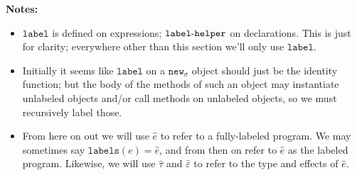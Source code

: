\documentclass{llncs}
\newcommand{\keywadj}[1]{\mathtt{#1}}
\newcommand{\hyphen}{\hbox{-}}
\begin{document}
\noindent \textbf{Notes:}
\begin{itemize}
\item $\keywadj{label}$ is defined on expressions; $\keywadj{label \hyphen helper}$ on declarations. This is just for clarity; everywhere other than this section we'll only use $\keywadj{label}$.
\item Initially it seems like $\keywadj{label}$ on a $\keywadj{new_\sigma}$ object should just be the identity function; but the body of the methods of such an object may instantiate unlabeled objects and/or call methods on unlabeled objects, so we must recursively label those.
\item From here on out we will use $\hat e$ to refer to a fully-labeled program. We may sometimes say $\keywadj{labels}(e) = \hat e$, and from then on refer to $\hat e$ as the labeled program. Likewise, we will use $\hat \tau$ and $\hat \varepsilon$ to refer to the type and effects of $\hat e$.
\end{itemize}
\end{document}
